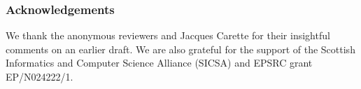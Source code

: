 \documentclass{llncs}
\begin{document}







\subsubsection*{Acknowledgements}
We thank the anonymous reviewers and Jacques Carette for their insightful
comments on an earlier draft. We are also grateful for the support of
the Scottish Informatics and Computer Science Alliance (SICSA) and
EPSRC grant EP/N024222/1.



\end{document}
